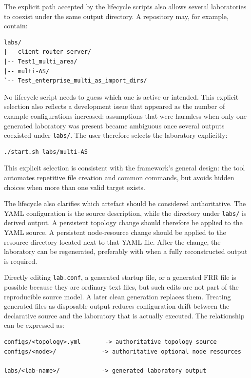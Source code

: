 The explicit path accepted by the lifecycle scripts also allows several
laboratories to coexist under the same output directory. A repository may, for
example, contain:

\begin{lstlisting}[caption={Several generated laboratories coexisting under labs/.},label={lst:multiple-labs}]
labs/
|-- client-router-server/
|-- Test1_multi_area/
|-- multi-AS/
`-- Test_enterprise_multi_as_import_dirs/
\end{lstlisting}

No lifecycle script needs to guess which one is active or intended. This
explicit selection also reflects a development issue that appeared as the
number of example configurations increased: assumptions that were harmless
when only one generated laboratory was present became ambiguous once several
outputs coexisted under \texttt{labs/}. The user therefore selects the
laboratory explicitly:

\begin{lstlisting}[language=bash,caption={Starting one laboratory among several generated environments.},label={lst:start-specific-lab}]
./start.sh labs/multi-AS
\end{lstlisting}

This explicit selection is consistent with the framework's general design: the
tool automates repetitive file creation and common commands, but avoids hidden
choices when more than one valid target exists.

The lifecycle also clarifies which artefact should be considered authoritative.
The YAML configuration is the source description, while the directory under
\texttt{labs/} is derived output. A persistent topology change should therefore
be applied to the YAML source. A persistent node-resource change should be
applied to the resource directory located next to that YAML file. After the
change, the laboratory can be regenerated, preferably with 
when a fully reconstructed output is required.

Directly editing \texttt{lab.conf}, a generated startup file, or a generated
FRR file is possible because they are ordinary text files, but such edits are
not part of the reproducible source model. A later clean generation replaces
them. Treating generated files as disposable output reduces configuration drift
between the declarative source and the laboratory that is actually executed.
The relationship can be expressed as:

\begin{lstlisting}[caption={Source and derived-output relationship.},label={lst:source-output}]
configs/<topology>.yml       -> authoritative topology source
configs/<node>/             -> authoritative optional node resources

labs/<lab-name>/            -> generated laboratory output
\end{lstlisting}

